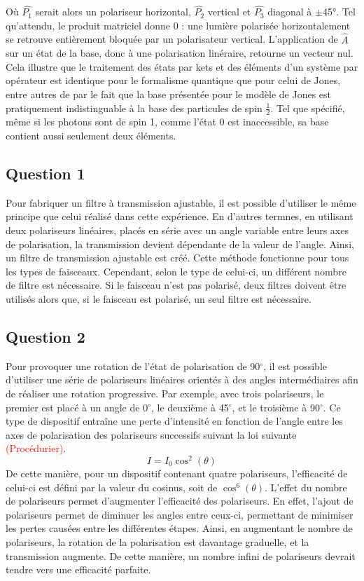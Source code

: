 \documentclass[11pt,letterpaper]{article}
\begin{document}
Où $\hat{P_1}$ serait alors un polariseur horizontal, $\hat{P_2}$ vertical et $\hat{P_3}$ diagonal à $\pm$45°. Tel qu'attendu, le produit matriciel donne 0 : une
lumière polarisée horizontalement se retrouve entièrement bloquée par un polarisateur vertical. L'application de $\hat{A}$ sur un état de la base, donc à une polarisation linéraire, retourne un vecteur nul. Cela illustre que le traitement
des états par kets et des éléments d'un système par opérateur est identique pour le formalisme quantique que pour celui de Jones, entre autres de par le fait que la base présentée pour le modèle de Jones est pratiquement indistinguable à la base des particules de spin $\frac{1}{2}$. Tel que spécifié, même si les photons sont de spin 1, comme l'état 0 est inaccessible, sa base contient aussi seulement deux éléments.

\subsection{Question 1}
Pour fabriquer un filtre à transmission ajustable, il est possible d'utiliser le même principe que celui réalisé dans cette expérience. En d'autres termnes, en utilisant deux polariseurs linéaires, placés en série avec un angle variable entre leurs axes de polarisation, la transmission devient dépendante de la valeur de l'angle. Ainsi, un filtre de transmission ajustable est créé. Cette méthode fonctionne pour tous les types de faisceaux. Cependant, selon le type de celui-ci, un différent nombre de filtre est nécessaire. Si le faisceau n'est pas polarisé, deux filtres doivent être utilisés alors que, si le faisceau est polarisé, un seul filtre est nécessaire.

\subsection{Question 2}
Pour provoquer une rotation de l'état de polarisation de 90$^\circ$, il est possible d'utiliser une série de polariseurs linéaires orientés à des angles intermédiaires afin de réaliser une rotation progressive. Par exemple, avec trois polariseurs, le premier est placé à un angle de 0$^\circ$, le deuxième à 45$^\circ$, et le troisième à 90$^\circ$. Ce type de dispositif entraîne une perte d'intensité en fonction de l'angle entre les axes de polarisation des polariseurs successifs suivant la loi suivante \textcolor{red}{(Procédurier)}.
\begin{equation}
  I=I_{0}\cos^{2}(\theta)
\end{equation}
De cette manière, pour un dispositif contenant quatre polariseurs, l'efficacité de celui-ci est défini par la valeur du cosinus, soit de $\cos^{6}(\theta)$. L'effet du nombre de polariseurs permet d'augmenter l'efficacité des polariseurs. En effet, l'ajout de polariseurs permet de diminuer les angles entre ceux-ci, permettant de minimiser les pertes causées entre les différentes étapes. Ainsi, en augmentant le nombre de polariseurs, la rotation de la polarisation est davantage graduelle, et la transmission augmente. De cette manière, un nombre infini de polariseurs devrait tendre vers une efficacité parfaite.
\end{document}
